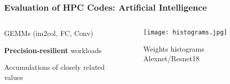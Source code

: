\begin{frame}
\frametitle{Evaluation of HPC Codes: Artificial Intelligence}


\begin{columns}

\begin{column}{0.5\textwidth}
    \begin{myitemize}
	\item GEMMs (im2col, FC, Conv)
	\item \textbf{Precision-resilient} workloads~\cite{johnson_rethinking_2018}
        \item Accumulations of closely related values~\cite{li_robustness-aware_2021}
    \end{myitemize}
\end{column}
\begin{column}{0.5\textwidth}
    \begin{figure}
        \texttt{[image: histograms.jpg]}
	    \caption{Weights histograms Alexnet/Resnet18}
    \end{figure}
\end{column}
\end{columns}


\normalsize


\end{frame}

